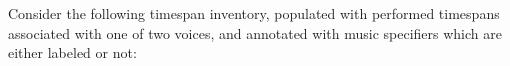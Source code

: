 Consider the following timespan inventory, populated with performed timespans
associated with one of two voices, and annotated with music specifiers which
are either labeled or not:

\begin{comment}
<abjad>
unlabeled_music_specifier = consort.MusicSpecifier()
labeled_music_specifier = consort.MusicSpecifier(labels=['labeled'])
timespan_inventory = timespantools.TimespanInventory([
    consort.PerformedTimespan(
        layer=1,
        start_offset=0,
        stop_offset=4,
        music_specifier=labeled_music_specifier,
        voice_name='Voice 1',
        ),
    consort.PerformedTimespan(
        layer=1,
        start_offset=2,
        stop_offset=7,
        music_specifier=labeled_music_specifier,
        voice_name='Voice 2',
        ),
    consort.PerformedTimespan(
        layer=2,
        start_offset=6,
        stop_offset=8,
        music_specifier=unlabeled_music_specifier,
        voice_name='Voice 1',
        ),
    consort.PerformedTimespan(
        layer=2,
        start_offset=10,
        stop_offset=(25, 2),
        music_specifier=unlabeled_music_specifier,
        voice_name='Voice 2',
        ),
    consort.PerformedTimespan(
        layer=1,
        start_offset=11,
        stop_offset=14,
        music_specifier=labeled_music_specifier,
        voice_name='Voice 1',
        ),
    consort.PerformedTimespan(
        layer=1,
        start_offset=14,
        stop_offset=16,
        music_specifier=labeled_music_specifier,
        voice_name='Voice 1',
        ),
    consort.PerformedTimespan(
        layer=1,
        start_offset=15,
        stop_offset=16,
        music_specifier=labeled_music_specifier,
        voice_name='Voice 2',
        ),
    ])
show(timespan_inventory, key='voice_name')
</abjad>
\end{comment}

